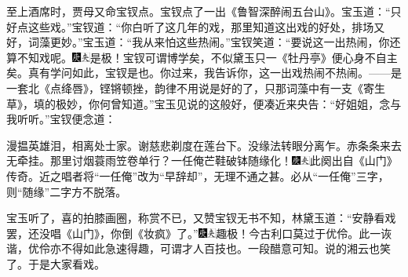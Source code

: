 至上酒席时，贾母又命宝钗点。宝钗点了一出《鲁智深醉闹五台山》。宝玉道：``只好点这些戏。''宝钗道：``你白听了这几年的戏，那里知道这出戏的好处，排场又好，词藻更妙。''宝玉道：``我从来怕这些热闹。''宝钗笑道：``要说这一出热闹，你还算不知戏呢。{\includegraphics[width=3mm]{../Images/00004}\includegraphics[width=3mm]{../Images/00012}\footnotesize \kaishu 是极！宝钗可谓博学矣，不似黛玉只一《牡丹亭》便心身不自主矣。真有学问如此，宝钗是也。}你过来，我告诉你，这一出戏热闹不热闹。------是一套北《点绛唇》，铿锵顿挫，韵律不用说是好的了，只那词藻中有一支《寄生草》，填的极妙，你何曾知道。''宝玉见说的这般好，便凑近来央告：``好姐姐，念与我听听。''宝钗便念道：

漫揾英雄泪，相离处士家。谢慈悲剃度在莲台下。没缘法转眼分离乍。赤条条来去无牵挂。那里讨烟蓑雨笠卷单行？一任俺芒鞋破钵随缘化！{\includegraphics[width=3mm]{../Images/00004}\includegraphics[width=3mm]{../Images/00012}\footnotesize \kaishu 此阕出自《山门》传奇。近之唱者将``一任俺''改为``早辞却''，无理不通之甚。必从``一任俺''三字，则``随缘''二字方不脱落。}

宝玉听了，喜的拍膝画圈，称赏不已，又赞宝钗无书不知，林黛玉道：``安静看戏罢，还没唱《山门》，你倒《妆疯》了。''{\includegraphics[width=3mm]{../Images/00004}\includegraphics[width=3mm]{../Images/00012}\footnotesize \kaishu 趣极！今古利口莫过于优伶。此一诙谐，优伶亦不得如此急速得趣，可谓才人百技也。一段醋意可知。}说的湘云也笑了。于是大家看戏。

